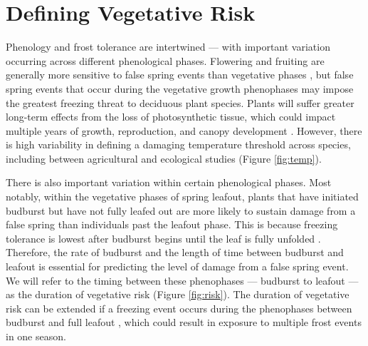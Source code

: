 \documentclass{article}\usepackage[]{graphicx}\usepackage[]{color}
\begin{document}
\section* {Defining Vegetative Risk}
Phenology and frost tolerance are intertwined --- with important variation occurring across different phenological phases. Flowering and fruiting are generally more sensitive to false spring events than vegetative phases \citep{Augspurger2009, Lenz2013}, but false spring events that occur during the vegetative growth phenophases may impose the greatest freezing threat to deciduous plant species.  Plants will suffer greater long-term effects from the loss of photosynthetic tissue, which could impact multiple years of growth, reproduction, and canopy development \citep{Vitasse2014, Xie2015}. However, there is high variability in defining a damaging temperature threshold across species, including between agricultural and ecological studies (Figure \ref{fig:temp}).

There is also important variation within certain phenological phases. Most notably, within the vegetative phases of spring leafout, plants that have initiated budburst but have not fully leafed out are more likely to sustain damage from a false spring than individuals past the leafout phase. This is because freezing tolerance is lowest after budburst begins until the leaf is fully unfolded \citep{Lenz2016}. Therefore, the rate of budburst and the length of time between budburst and leafout is essential for predicting the level of damage from a false spring event. We will refer to the timing between these phenophases --- budburst to leafout --- as the duration of vegetative risk (Figure \ref{fig:risk}). The duration of vegetative risk can be extended if a freezing event occurs during the phenophases between budburst and full leafout \citep{Augspurger2009}, which could result in exposure to multiple frost events in one season.
\end{document}
